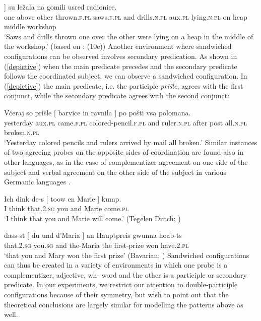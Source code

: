 \documentclass[output=paper
,modfonts
,nonflat]{langsci/langscibook}
\begin{document}
\ea \label{jednenadruge}
\gll [ Jedne na druge nabacane [ testere i svrdla ]]  su  ležala  na gomili usred radionice. \\
{} one above other  thrown.\textsc{f.pl} {} saws.\textsc{f.pl} and drills.\textsc{n.pl} {}  aux.\textsc{pl} lying.\textsc{n.pl} on heap  middle workshop\\
\glt `Saws and drills thrown one over the other were lying on a heap in the middle of the workshop.' (based on \citealt{aljovicbegovic:16}: (10e))
\z
Another environment where sandwiched configurations can be observed involves secondary predication. As shown in (\ref{depictive}) when the main predicate precedes and the secondary predicate follows the coordinated subject, we can observe a sandwiched configuration. In (\ref{depictive}) the main predicate, i.e. the participle \textit{prišle}, agrees with the first conjunct, while the secondary predicate agrees with the second conjunct:

\ea \label{depictive}
\gll Včeraj so prišle [ barvice in ravnila ] po pošti vsa polomana.\\
yesterday aux.\textsc{pl} came.\textsc{f.pl} {} colored-pencil.\textsc{f.pl} and ruler.\textsc{n.pl} {} after post all.\textsc{n.pl} broken.\textsc{n.pl}\\
\glt `Yesterday colored pencils and rulers arrived by mail all broken.'
\z
Similar instances of two agreeing probes on the opposite sides of coordination are found also in other languages, as in the case of complementizer agreement on one side of the subject and verbal agreement on the other side of the subject in various Germanic languages \citep{koppen:05, haegemankoppen:12, bayer:12}.

\ea 
\gll Ich dink de-s [ toow en Marie ] kump. \\
I think that.\textsc{2.sg} {} you and Marie {} come.\textsc{pl} \\
\glt `I think that you and Marie will come.' (Tegelen Dutch; \citealt{haegemankoppen:12})
\z

\ea 
\gll dass-st [ du         und d’Maria ] an Hauptpreis gwunna hoab-ts\\
that.\textsc{2.sg} {} you.\textsc{sg} and the-Maria {} the first-prize won have.\textsc{2.pl}\\
\glt `that you and Mary won the first prize' (Bavarian; \citealt{bayer:12})
\z
Sandwiched configurations can thus be created in a variety of environments in which one probe is a complementizer, adjective, wh- word and the other is a participle or secondary predicate. In our experiments, we restrict our attention to double-participle configurations because of their symmetry, but wish to point out that the theoretical conclusions are largely similar for modelling the patterns above as well.
\end{document}
